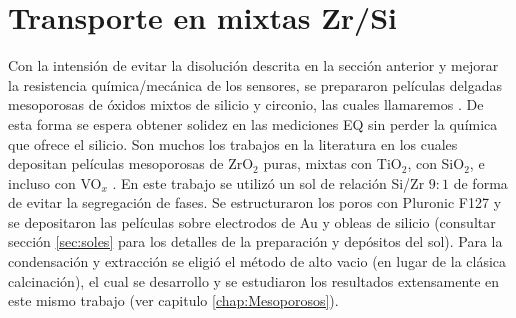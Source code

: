 			
	
    




	\section{Transporte en \pdm\space mixtas Zr/Si}

			Con la intensión de evitar la disolución descrita en la sección anterior y mejorar la resistencia química/mecánica de los sensores, se prepararon películas delgadas mesoporosas de óxidos mixtos de silicio y circonio, las cuales llamaremos \pdmZ. De esta forma se espera obtener solidez en las mediciones EQ sin perder la química que ofrece el silicio. Son muchos los trabajos en la literatura en los cuales depositan películas mesoporosas de ZrO$_2$ puras, mixtas con TiO$_2$, con SiO$_2$, e incluso con VO$_x$ \cite{Soler-Illia2004,Crepaldi2002a,Gimenez2016,Zelcer2013,Calvo20210,Angelome2008}. En este trabajo se utilizó un sol de relación Si/Zr $9\!:\!1$ de forma de evitar la segregación de fases\cite{Soler-Illia2004}. Se estructuraron los poros con Pluronic F127 y se depositaron las películas sobre electrodos de Au y obleas de silicio (consultar sección \ref{sec:soles} para los detalles de la preparación y depósitos del sol). Para la condensación y extracción se eligió el método de alto vacio (en lugar de la clásica calcinación), el cual se desarrollo y se estudiaron los resultados extensamente en este mismo trabajo (ver capitulo \ref{chap:Mesoporosos}).

